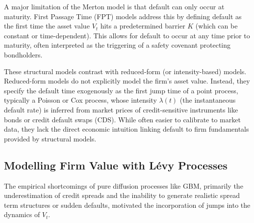 \documentclass[11pt,twoside,openright]{report}
\begin{document}
A major limitation of the Merton model is that default can only occur at maturity. First Passage Time (FPT) models address this by defining default as the first time the asset value $V_t$ hits a predetermined barrier $K$ (which can be constant or time-dependent). This allows for default to occur at any time prior to maturity, often interpreted as the triggering of a safety covenant protecting bondholders.

These structural models contrast with reduced-form (or intensity-based) models. Reduced-form models do not explicitly model the firm's asset value. Instead, they specify the default time exogenously as the first jump time of a point process, typically a Poisson or Cox process, whose intensity $\lambda(t)$ (the instantaneous default rate) is inferred from market prices of credit-sensitive instruments like bonds or credit default swaps (CDS). While often easier to calibrate to market data, they lack the direct economic intuition linking default to firm fundamentals provided by structural models.

\subsection{Modelling Firm Value with Lévy Processes}
\label{subsec:modelling_firm_value}

The empirical shortcomings of pure diffusion processes like GBM, primarily the underestimation of credit spreads and the inability to generate realistic spread term structures or sudden defaults, motivated the incorporation of jumps into the dynamics of $V_t$.
\end{document}
